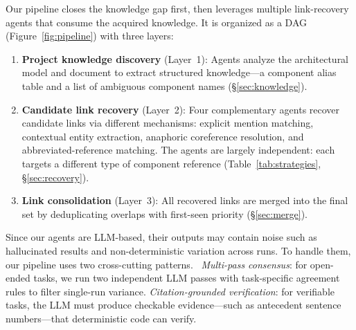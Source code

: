 Our pipeline closes the knowledge gap first, then leverages multiple
link-recovery agents that consume the acquired knowledge.
It is organized as a DAG (Figure~\ref{fig:pipeline}) with three
layers:

\begin{enumerate}
\item \textbf{Project knowledge discovery} (Layer~1):
  Agents analyze the architectural model and document to extract
  structured knowledge---a component alias table and a list of
  ambiguous component names (\S\ref{sec:knowledge}).

\item \textbf{Candidate link recovery} (Layer~2):
  Four complementary agents recover candidate links via different
  mechanisms: explicit mention matching, contextual entity extraction,
  anaphoric coreference resolution, and abbreviated-reference matching.
  The agents are largely independent: each targets a different type of
  component reference
  (Table~\ref{tab:strategies}, \S\ref{sec:recovery}).

\item \textbf{Link consolidation} (Layer~3):
  All recovered links are merged into the final set by deduplicating
  overlaps with first-seen priority (\S\ref{sec:merge}).
\end{enumerate}

Since our agents are LLM-based, their outputs may contain noise such
as hallucinated results and non-deterministic variation across runs.
To handle them, our pipeline uses two cross-cutting
patterns.~
\emph{Multi-pass consensus}: for open-ended tasks, we run two
independent LLM passes with task-specific agreement rules to filter
single-run variance.
\emph{Citation-grounded verification}: for verifiable tasks, the LLM
must produce checkable evidence---such as antecedent sentence
numbers---that deterministic code can verify.

